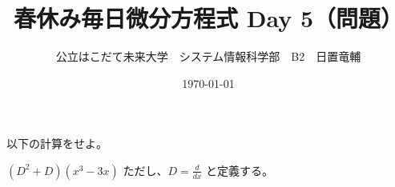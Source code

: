 \documentclass[dvipdfmx,uplatex]{jsarticle}
\title{春休み毎日微分方程式 Day 5（問題）}
\author{公立はこだて未来大学　システム情報科学部　B2　日置竜輔}
\date{\today}
\begin{document}
\begin{spacing}{1.6}
\maketitle

以下の計算をせよ。
\begin{qparts}
    \qpart $ \displaystyle (D ^ 2 + D)(x ^ 3 - 3x) $ \quad ただし、$ \displaystyle D = \frac{d}{dx} $ と定義する。\\
\end{qparts}
\end{spacing}
\end{document}

